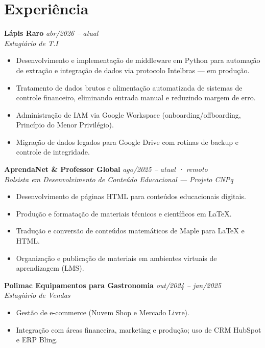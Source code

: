 \documentclass[11pt,a4paper]{article}
\begin{document}
\section{Experiência}

\textbf{Lápis Raro} \hfill \textit{abr/2026 -- atual}\\
\textit{Estagiário de T.I}
\begin{itemize}
  \item Desenvolvimento e implementação de middleware em Python para automação de extração e
        integração de dados via protocolo Intelbras --- em produção.
  \item Tratamento de dados brutos e alimentação automatizada de sistemas de controle financeiro,
        eliminando entrada manual e reduzindo margem de erro.
  \item Administração de IAM via Google Workspace (onboarding/offboarding, Princípio do Menor Privilégio).
  \item Migração de dados legados para Google Drive com rotinas de backup e controle de integridade.
\end{itemize}

\medskip

\textbf{AprendaNet \& Professor Global} \hfill \textit{ago/2025 -- atual · remoto}\\
\textit{Bolsista em Desenvolvimento de Conteúdo Educacional --- Projeto CNPq}
\begin{itemize}
  \item Desenvolvimento de páginas HTML para conteúdos educacionais digitais.
  \item Produção e formatação de materiais técnicos e científicos em \LaTeX.
  \item Tradução e conversão de conteúdos matemáticos de Maple para \LaTeX{} e HTML.
  \item Organização e publicação de materiais em ambientes virtuais de aprendizagem (LMS).
\end{itemize}

\medskip

\textbf{Polimac Equipamentos para Gastronomia} \hfill \textit{out/2024 -- jan/2025}\\
\textit{Estagiário de Vendas}
\begin{itemize}
  \item Gestão de e-commerce (Nuvem Shop e Mercado Livre).
  \item Integração com áreas financeira, marketing e produção; uso de CRM HubSpot e ERP Bling.
\end{itemize}
\end{document}
